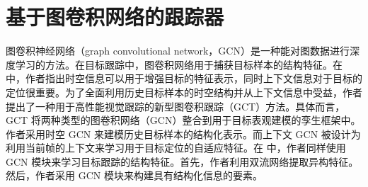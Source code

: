 \section{基于图卷积网络的跟踪器}
图卷积神经网络（graph convolutional network，GCN）是一种能对图数据进行深度学习的方法。在目标跟踪中，图卷积网络用于捕获目标样本的结构特征。在 \cite{gao2019graph} 中，作者指出时空信息可以用于增强目标的特征表示，同时上下文信息对于目标的定位很重要。为了全面利用历史目标样本的时空结构并从上下文信息中受益，作者提出了一种用于高性能视觉跟踪的新型图卷积跟踪（GCT）方法。具体而言，GCT 将两种类型的图卷积网络（GCN）整合到用于目标表观建模的孪生框架中。作者采用时空 GCN 来建模历史目标样本的结构化表示。而上下文 GCN 被设计为利用当前帧的上下文来学习用于目标定位的自适应特征。在 \cite{tu2019visual} 中，作者同样使用 GCN 模块来学习目标跟踪的结构特征。首先，作者利用双流网络提取异构特征。然后，作者采用 GCN 模块来构建具有结构化信息的要素。


